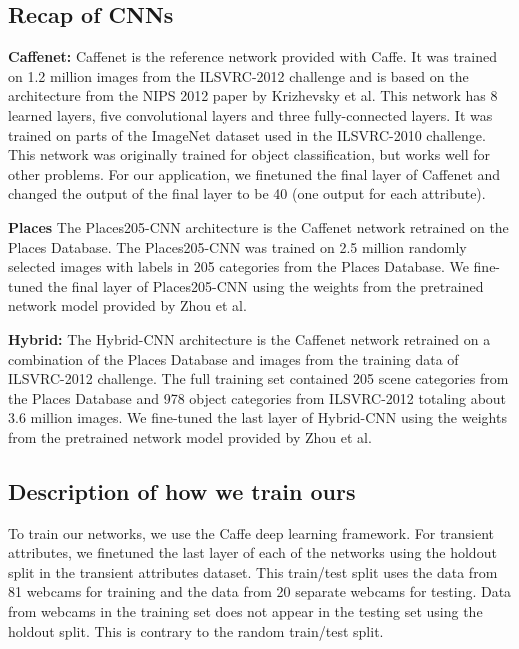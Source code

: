 \documentclass{article}
\newcommand{\todo}[1]{\textcolor{red}{todo: {\em #1}}}
\begin{document}

\subsection{Recap of CNNs}
\indent

\textbf{Caffenet:} Caffenet is the reference network provided with 
Caffe\cite{caffe14}.  It was trained on 1.2 million images from the 
ILSVRC-2012\cite{ILSVRCarxiv14} challenge and is based on the architecture from 
the NIPS 2012 paper by Krizhevsky\cite{caffenetnips12} et al.  This network has 
8 learned layers, five convolutional layers and three fully-connected layers.  
It was trained on parts of the ImageNet dataset used in the 
ILSVRC-2010\cite{ILSVRCarxiv14} challenge.  This network was originally trained 
for object classification, but works well for other problems. For our application, 
we finetuned the final layer of Caffenet and changed the output of the final 
layer to be 40 (one output for each attribute).

\textbf{Places} The Places205-CNN architecture is the Caffenet network retrained on 
the Places Database\cite{zhou2014places}.  The Places205-CNN was trained on 2.5
million randomly selected images with labels in 205 categories from the Places 
Database.  We fine-tuned the final layer of Places205-CNN using the weights from the
pretrained network model provided by Zhou\cite{zhou2014places} et al.

\textbf{Hybrid:} The Hybrid-CNN architecture is the Caffenet network retrained on
a combination of the Places Database\cite{zhou2014places} and images from the 
training data of ILSVRC-2012\cite{ILSVRCarxiv14} challenge.  The full training set
contained 205 scene categories from the Places Database and 978 object categories
from ILSVRC-2012 totaling about 3.6 million images.  We fine-tuned the last 
layer of Hybrid-CNN using the weights from the pretrained network model provided by 
Zhou\cite{zhou2014places} et al.

\subsection{Description of how we train ours}
\indent

To train our networks, we use the Caffe\cite{caffe14} deep learning framework. 
For transient attributes, we finetuned the last layer of each of the networks using 
the holdout split in the transient attributes dataset.  This train/test split uses
the data from 81 webcams for training and the data from 20 separate 
webcams for testing.  Data from webcams in the training set does not
appear in the testing set using the holdout split.  This is contrary to 
the random train/test split.  
\end{document}
